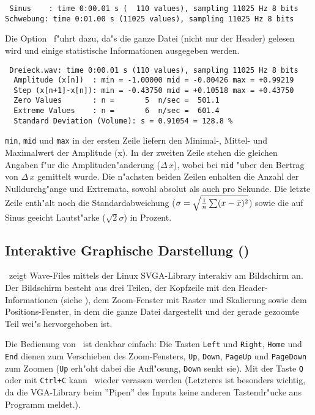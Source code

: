 {\btxt\footnotesize\tt
Sinus\ \ \ \ : time 0:00.01 s (\ \ 110 values), sampling 11025 Hz 8 bits \\
Schwebung: time 0:01.00 s (11025 values), sampling 11025 Hz 8 bits
\etxt}

Die Option \ f"uhrt dazu, da"s die ganze Datei (nicht nur der
Header) gelesen wird und einige statistische Informationen 
ausgegeben werden.

{\btxt\footnotesize\tt
Dreieck.wav: time 0:00.01 s (110 values), sampling 11025 Hz 8 bits \\
\ \ Amplitude (x[n])\ \ : min = -1.00000  mid = -0.00426  max = +0.99219 \\
\ \ Step (x[n+1]-x[n]): min = -0.43750  mid = +0.10518  max = +0.43750 \\
\ \ Zero Values\ \ \ \ \ \ \ : n =\ \ \ \ \ \ \ 5\ \ n/sec = \  501.1 \\
\ \ Extreme Values \ \ \ : n =\ \ \ \ \ \ \ 6\ \ n/sec = \  601.4 \\
\ \ Standard Deviation (Volume): s = 0.91054 = 128.8 \%
\etxt}

{\tt min}, {\tt mid} und {\tt max} in der ersten Zeile liefern den Minimal-,
Mittel- und Maximalwert der Amplitude (x). In der zweiten Zeile
stehen die gleichen Angaben f"ur die Amplituden"anderung 
($\Delta \, x$), wobei bei {\tt mid} "uber den Bertrag von 
$\Delta \, x$ gemittelt wurde. Die n"achsten beiden Zeilen enhalten
die Anzahl der Nulldurchg"ange und Extremata, sowohl absolut als auch
pro Sekunde. Die letzte Zeile enth"alt noch die Standardabweichung
($\sigma=\sqrt{{1\over n}\sum (x-\bar{x})^2}$) sowie die auf
Sinus geeicht Lautst"arke ($\sqrt{2} \sigma$) in Prozent.


\subsection{Interaktive Graphische Darstellung (\wview)}



\wview\ zeigt Wave-Files mittels der Linux SVGA-Library interakiv
am Bildschirm an. Der Bildschirm besteht aus drei Teilen, der
Kopfzeile mit den Header-Informationen (siehe \winf), dem Zoom-Fenster
mit Raster und Skalierung sowie dem Positions-Fenster, in dem die
ganze Datei dargestellt und der gerade gezoomte Teil wei"s
hervorgehoben ist.

Die Bedienung von \wview\ ist denkbar einfach: Die Tasten 
{\tt Left} und {\tt Right}, {\tt Home} und {\tt End} dienen 
zum Verschieben des Zoom-Fensters, {\tt Up}, {\tt Down}, 
{\tt PageUp} und {\tt PageDown} zum Zoomen ({\tt Up} erh"oht
dabei die Aufl"osung, {\tt Down} senkt sie).
Mit der Taste {\tt Q} oder mit {\tt Ctrl+C} kann \wview\ wieder
verassen werden (Letzteres ist besonders wichtig, da die 
VGA-Library beim ''Pipen'' des Inputs keine anderen Tastendr"ucke
ans Programm meldet.).


